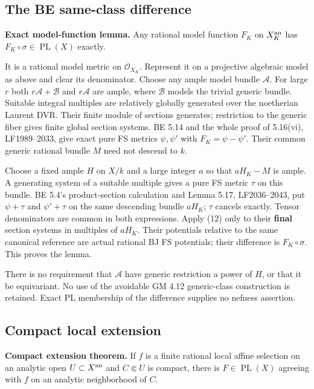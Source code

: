 \documentclass[
  11pt,
]{article}
\begin{document}
\subsection{The BE same-class
difference}\label{the-be-same-class-difference}

\textbf{Exact model-function lemma.} Any rational model function \(F_K\)
on \(X_K^{\rm an}\) has \(F_K\circ\sigma\in\operatorname{PL}(X)\)
exactly.

It is a rational model metric on \(\mathcal O_{X_K}\). Represent it on a
projective algebraic model as above and clear its denominator. Choose
any ample model bundle \(\mathcal A\). For large \(r\) both
\(r\mathcal A+\mathcal B\) and \(r\mathcal A\) are ample, where
\(\mathcal B\) models the trivial generic bundle. Suitable integral
multiples are relatively globally generated over the noetherian Laurent
DVR. Their finite module of sections generates; restriction to the
generic fiber gives finite global section systems. BE 5.14 and the whole
proof of 5.16(vi), LF1989--2033, give exact pure FS metrics
\(\psi,\psi'\) with \(F_K=\psi-\psi'\). Their common generic rational
bundle \(M\) need not descend to \(k\).

Choose a fixed ample \(H\) on \(X/k\) and a large integer \(a\) so that
\(aH_K-M\) is ample. A generating system of a suitable multiple gives a
pure FS metric \(\tau\) on this bundle. BE 5.4's product-section
calculation and Lemma 5.17, LF2036--2043, put \(\psi+\tau\) and
\(\psi'+\tau\) on the same descending bundle \(aH_K\); \(\tau\) cancels
exactly. Tensor denominators are common in both expressions. Apply (12)
only to their \textbf{final} section systems in multiples of \(aH_K\).
Their potentials relative to the same canonical reference are actual
rational BJ FS potentials; their difference is \(F_K\circ\sigma\). This
proves the lemma.

There is no requirement that \(\mathcal A\) have generic restriction a
power of \(H\), or that it be equivariant. No use of the avoidable GM
4.12 generic-class construction is retained. Exact PL membership of the
difference supplies no nefness assertion.

\subsection{Compact local extension}\label{compact-local-extension}

\textbf{Compact extension theorem.} If \(f\) is a finite rational local
affine selection on an analytic open \(U\subset X^{\rm an}\) and
\(C\Subset U\) is compact, there is \(F\in\operatorname{PL}(X)\)
agreeing with \(f\) on an analytic neighborhood of \(C\).
\end{document}
